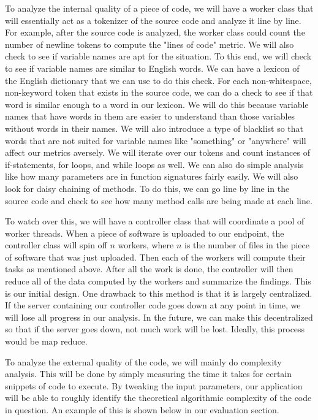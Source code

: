 \documentclass{sig-alternate}
\begin{document}
To analyze the internal quality of a piece of code, we will have a worker class that will essentially act as a tokenizer of the source code and analyze it line by line. For example, after the source code is analyzed, the worker class could count the number of newline tokens to compute the "lines of code" metric. We will also check to see if variable names are apt for the situation. To this end, we will check to see if variable names are similar to English words. We can have a lexicon of the English dictionary that we can use to do this check. For each non-whitespace, non-keyword token that exists in the source code, we can do a check to see if that word is similar enough to a word in our lexicon. We will do this because variable names that have words in them are easier to understand than those variables without words in their names. We will also introduce a type of blacklist so that words that are not suited for variable names like "something" or "anywhere" will affect our metrics aversely. We will iterate over our tokens and count instances of if-statements, for loops, and while loops as well. We can also do simple analysis like how many parameters are in function signatures fairly easily. We will also look for daisy chaining of methods. To do this, we can go line by line in the source code and check to see how many method calls are being made at each line. 

To watch over this, we will have a controller class that will coordinate a pool of worker threads. When a piece of software is uploaded to our endpoint, the controller class will spin off $n$ workers, where $n$ is the number of files in the piece of software that was just uploaded. Then each of the workers will compute their tasks as mentioned above. After all the work is done, the controller will then reduce all of the data computed by the workers and summarize the findings. This is our initial design. One drawback to this method is that it is largely centralized. If the server containing our controller code goes down at any point in time, we will lose all progress in our analysis. In the future, we can make this decentralized so that if the server goes down, not much work will be lost. Ideally, this process would be map reduce.

To analyze the external quality of the code, we will mainly do complexity analysis. This will be done by simply measuring the time it takes for certain snippets of code to execute. By tweaking the input parameters, our application will be able to roughly identify the theoretical algorithmic complexity of the code in question. An example of this is shown below in our evaluation section.
\end{document}
